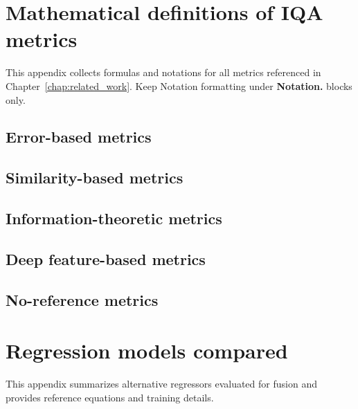 
\appendix

\chapter{Mathematical definitions of IQA metrics}\label{appendix:metrics}
This appendix collects formulas and notations for all metrics referenced in Chapter~\ref{chap:related_work}. Keep Notation formatting under \textbf{Notation.} blocks only.

\section{Error-based metrics}\label{appendix:metrics_error}

\section{Similarity-based metrics}\label{appendix:metrics_similarity}

\section{Information-theoretic metrics}\label{appendix:metrics_information}

\section{Deep feature-based metrics}\label{appendix:metrics_deep}

\section{No-reference metrics}\label{appendix:metrics_nr}

\chapter{Regression models compared}\label{appendix:regressors}
This appendix summarizes alternative regressors evaluated for fusion and provides reference equations and training details.

